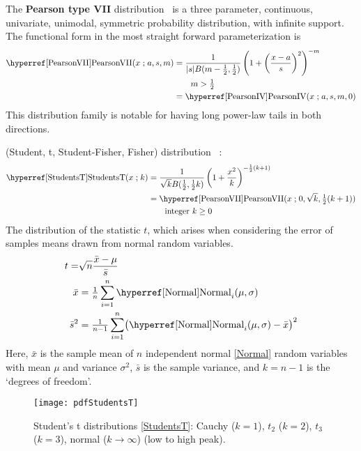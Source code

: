 


The {\bf Pearson type VII} distribution~\cite{Pearson1916} is a three parameter, continuous, univariate, unimodal, symmetric probability distribution, with infinite support. The functional form in the most straight forward parameterization is
\begin{align}
\label{PearsonVII}
\opr{PearsonVII}(x\given a,s, m) 
&= \frac{1}{|s| B(m-\frac{1}{2}, \frac{1}{2} )} \left( 1 +\left( \frac{x-a}{s}\right)^2 \right)^{-m} 	\checked
\\ \notag
& \qquad m > \tfrac{1}{2}
\\ \notag & = \opr{PearsonIV}(x\given a,s, m,0)  \checked
\end{align}
This distribution family is notable for having long power-law tails in both directions. 




 (Student, t, Student-Fisher, Fisher) distribution~\cite{Student1908,Fisher1925b,Hanley2008, Zabell2008} :
\begin{align}
\label{StudentsT}
\opr{StudentsT}(x\given k) 
&= \frac{1}{\sqrt{k} B(\frac{1}{2}, \frac{1}{2} k)} \left( 1 + \frac{x^2}{k} \right)^{-\frac{1}{2}(k+1)} \checked
\\ &= \opr{PearsonVII}(x\given 0,\sqrt{k},\tfrac{1}{2}(k+1)) \checked
\notag
\\ & \qquad \text{integer } k \geq 0
\notag
\end{align}
The distribution of the statistic $t$, which arises when considering the error of samples means drawn from normal random variables.
\begin{align*}
	t =& \sqrt{n} \frac {\bar{x} - \mu}{\bar{s}}  \checked \\ 
	\bar{x} & = \tfrac{1}{n} \sum_{i=1}^{n} \opr{Normal}_i (\mu,\sigma)   \checked \\
	\bar{s}^2 &= \tfrac{1}{n-1} \sum_{i=1}^{n} \bigl( \opr{Normal}_i (\mu,\sigma) - \bar{x} \bigr)^2 \checked
\end{align*}
Here, $\bar{x}$ is the sample mean of $n$ independent normal \eqref{Normal} random variables with mean $\mu$ and variance  $\sigma^2$, $\bar{s}$ is the sample variance, and $k=n-1$ is the `degrees of freedom'.


\begin{figure}[t]
\begin{center}
\texttt{[image: pdfStudentsT]}
\end{center}
\caption[Student's t distributions]{Student's t distributions \eqref{StudentsT}: Cauchy ($k=1$), $t_2$ ($k=2$), $t_3$ ($k=3$), normal ($k\rightarrow\infty$) (low to high peak).}
\end{figure}

